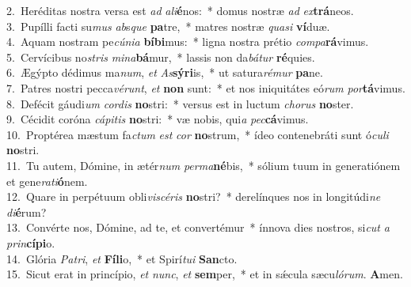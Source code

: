 {2.~}Heréditas nostra versa est \textit{ad} \textit{a}\textit{li}\textbf{é}nos:~* domus nostræ \textit{ad} \textit{ex}\textbf{trá}neos.\\
{3.~}Pupílli facti su\textit{mus} \textit{ab}s\textit{que} \textbf{pa}tre,~* matres nostræ \textit{qua}\textit{si} \textbf{ví}duæ.\\
{4.~}Aquam nostram pe\textit{cú}\textit{ni}\textit{a} \textbf{bí}\textbf{bi}mus:~* ligna nostra prétio \textit{com}\textit{pa}\textbf{rá}vimus.\\
{5.~}Cervícibus no\textit{stris} \textit{mi}\textit{na}\textbf{bá}mur,~* lassis non da\textit{bá}\textit{tur} \textbf{ré}quies.\\
{6.~}Ægýpto dédimus ma\textit{num}, \textit{et} \textit{As}\textbf{sý}\textbf{ri}is,~* ut satura\textit{ré}\textit{mur} \textbf{pa}ne.\\
{7.~}Patres nostri pecca\textit{vé}\textit{runt}, \textit{et} \textbf{non} sunt:~* et nos iniquitátes eó\textit{rum} \textit{por}\textbf{tá}vimus.\\
{8.~}Defécit gáudi\textit{um} \textit{cor}\textit{dis} \textbf{no}stri:~* versus est in luctum \textit{cho}\textit{rus} \textbf{no}ster.\\
{9.~}Cécidit coróna \textit{cá}\textit{pi}\textit{tis} \textbf{no}stri:~* væ nobis, qui\textit{a} \textit{pec}\textbf{cá}vimus.\\
{10.~}Proptérea mæstum fa\textit{ctum} \textit{est} \textit{cor} \textbf{no}strum,~* ídeo contenebráti sunt ó\textit{cu}\textit{li} \textbf{no}stri.\\
{11.~}Tu autem, Dómine, in ætér\textit{num} \textit{per}\textit{ma}\textbf{né}bis,~* sólium tuum in generatiónem et gene\textit{ra}\textit{ti}\textbf{ó}nem.\\
{12.~}Quare in perpétuum obli\textit{vi}\textit{scé}\textit{ris} \textbf{no}stri?~* derelínques nos in longitúdi\textit{ne} \textit{di}\textbf{é}rum?\\
{13.~}Convérte nos, Dómine, ad te, et convertémur~* ínnova dies nostros, si\textit{cut} \textit{a} \textit{prin}\textbf{cí}\textbf{pi}o.\\
{14.~}Glória \textit{Pa}\textit{tri}, \textit{et} \textbf{Fí}\textbf{li}o,~* et Spirí\textit{tu}\textit{i} \textbf{San}cto.\\
{15.~}Sicut erat in princípio, \textit{et} \textit{nunc}, \textit{et} \textbf{sem}per,~* et in sǽcula sæcu\textit{ló}\textit{rum}. \textbf{A}men.\\

